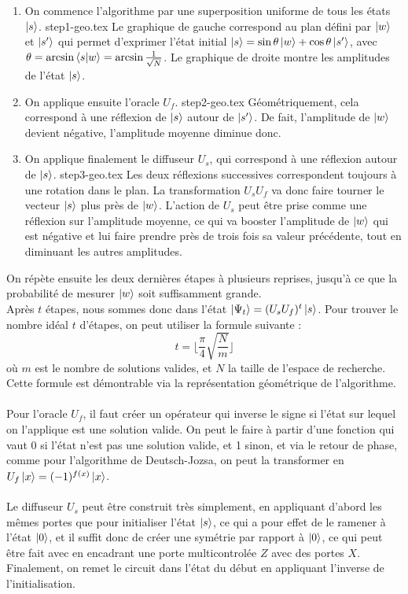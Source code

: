 \begin{enumerate}
    \item On commence l'algorithme par une superposition uniforme de tous les états $\ket{s}$.
        {step1-geo.tex}
        Le graphique de gauche correspond au plan défini par $\ket{w}$ et $\ket{s'}$ qui permet
        d'exprimer l'état initial $\ket{s} = \sin \theta \ket{w} + \cos \theta \ket{s'}$, avec
        $\theta = \arcsin \braket{s}{w} = \arcsin \frac{1}{\sqrt{N}}$.
        Le graphique de droite montre les amplitudes de l'état $\ket{s}$.
    \item On applique ensuite l'oracle $U_f$.
        {step2-geo.tex}
        Géométriquement, cela correspond à une réflexion de $\ket{s}$ autour de $\ket{s'}$.
        De fait, l'amplitude de $\ket{w}$ devient négative, l'amplitude moyenne diminue donc.
    \item On applique finalement le diffuseur $U_s$, qui correspond à une réflexion autour
        de $\ket{s}$.
        {step3-geo.tex}
        Les deux réflexions successives correspondent toujours à une rotation dans le plan.
        La transformation $U_s U_f$ va donc faire tourner le vecteur $\ket{s}$ plus près de $\ket{w}$.
        L'action de $U_s$ peut être prise comme une réflexion sur l'amplitude moyenne, ce qui va
        booster l'amplitude de $\ket{w}$ qui est négative et lui faire prendre près de trois fois sa
        valeur précédente, tout en diminuant les autres amplitudes.
\end{enumerate}
On répète ensuite les deux dernières étapes à plusieurs reprises, jusqu'à ce que la probabilité
de mesurer $\ket{w}$ soit suffisamment grande.\\
Après $t$ étapes, nous sommes donc dans l'état $\ket{\Psi_t} = (U_s U_f)^t \ket{s}$.
Pour trouver le nombre idéal $t$ d'étapes, on peut utiliser la formule suivante :
\[
    t = \lfloor \frac{\pi}{4} \sqrt{\frac{N}{m}} \rfloor
\]
où $m$ est le nombre de solutions valides, et $N$ la taille de l'espace de recherche.
Cette formule est démontrable via la représentation géométrique de l'algorithme.\\ \\
Pour l'oracle $U_f$, il faut créer un opérateur qui inverse le signe si l'état sur lequel
on l'applique est une solution valide.
On peut le faire à partir d'une fonction qui vaut 0 si l'état n'est pas une solution valide,
et 1 sinon, et via le retour de phase, comme pour l'algorithme de Deutsch-Jozsa, on peut la
transformer en $U_f \ket{x} = (-1)^{f(x)} \ket{x}$.\\ \\
Le diffuseur $U_s$ peut être construit très simplement, en appliquant d'abord les mêmes portes
que pour initialiser l'état $\ket{s}$, ce qui a pour effet de le ramener à l'état $\ket{0}$,
et il suffit donc de créer une symétrie par rapport à $\ket{0}$, ce qui peut être fait avec
en encadrant une porte multicontrolée $Z$ avec des portes $X$.
Finalement, on remet le circuit dans l'état du début en appliquant l'inverse de l'initialisation.

